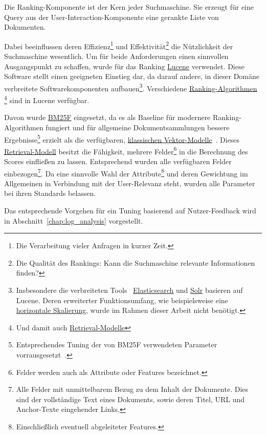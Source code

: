 Die Ranking-Komponente ist der Kern jeder Suchmaschine.
Sie erzeugt für eine Query aus der User-Interaction-Komponente eine gerankte Liste von Dokumenten.

Dabei beeinflussen deren Effizienz\footnote{Die Verarbeitung vieler Anfragen in kurzer Zeit.}
und Effektivität\footnote{Die Qualität des Rankings: Kann die Suchmaschine relevante Informationen finden?}
die Nützlichkeit der Suchmaschine wesentlich.
Um für beide Anforderungen einen sinnvollen Ausgangspunkt zu schaffen, wurde für das Ranking
\href{https://lucene.apache.org/}{Lucene} verwendet.
Diese Software stellt einen geeigneten Einstieg dar, da darauf andere,
in dieser Domäne verbreitete Softwarekomponenten aufbauen\footnote{Insbesondere die verbreiteten Tools~\cite{dbengines}
\href{https://de.wikipedia.org/wiki/Elasticsearch}{Elasticsearch} und \href{http://lucene.apache.org/solr/}{Solr}
basieren auf Lucene. Deren erweiterter Funktionsumfang, wie beispielsweise eine
\href{http://www.searchdatacenter.de/definition/Horizontale-Skalierung-Scale-out}{horizontale Skalierung}, wurde im Rahmen dieser Arbeit nicht benötigt.}.
Verschiedene \href{https://en.wikipedia.org/wiki/Ranking_(information_retrieval)}{Ranking-Algorithmen}
\footnote{Und damit auch 
\href{https://de.wikipedia.org/wiki/Information_Retrieval\#Retrievalmodelle}{Retrieval-Modelle}}
sind in Lucene verfügbar.

Davon wurde \href{https://en.wikipedia.org/wiki/Okapi_BM25}{BM25F} eingesetzt,
da es als Baseline für modernere Ranking-Algorithmen fungiert und für allgemeine
Dokumentsammlungen bessere Ergebnisse\footnote{Entsprechendes Tuning der von BM25F verwendeten Parameter vorrausgesetzt~\cite{baeza_yates.107}.}
erzielt als die verfügbaren,
\href{https://opensourceconnections.com/blog/2015/10/16/bm25-the-next-generation-of-lucene-relevation/}{klassischen Vektor-Modelle}~\cite{baeza_yates.107}.
Dieses \href{https://de.wikipedia.org/wiki/Information_Retrieval#Retrievalmodelle}{Retrieval-Modell}
besitzt die Fähigkeit, mehrere Felder\footnote{Felder werden auch als Attribute oder Features bezeichnet.} in die Berechnung des Scores einfließen zu lassen.
Entsprechend wurden alle verfügbaren Felder 
einbezogen\footnote{Alle Felder mit unmittelbarem Bezug zu dem Inhalt der Dokumente.
Dies sind der vollständige Text eines Dokuments, sowie deren Titel, URL und Anchor-Texte eingehender Links.}.
Da eine sinnvolle Wahl der Attribute\footnote{Einschließlich eventuell abgeleiteter Features.}
und deren Gewichtung im Allgemeinen in
Verbindung mit der User-Relevanz steht, wurden alle Parameter bei ihren Standards belassen.

Das entsprechende Vorgehen für ein Tuning basierend auf Nutzer-Feedback
wird in Abschnitt~\ref{chap:log_analysis} vorgestellt.
